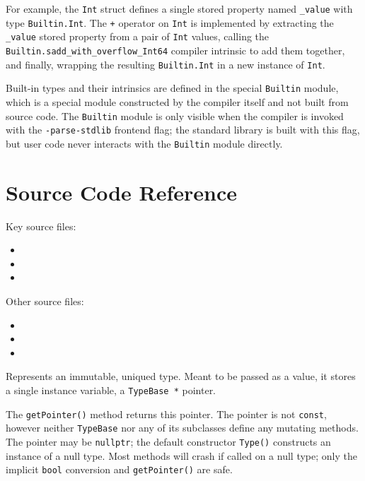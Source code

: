 \documentclass[../generics]{subfiles}
\begin{document}
For example, the \texttt{Int} struct defines a single stored property named \texttt{\_value} with type \texttt{Builtin.Int}. The \texttt{+} operator on \texttt{Int} is implemented by extracting the \texttt{\_value} stored property from a pair of \texttt{Int} values, calling the \texttt{Builtin.sadd\_with\_overflow\_Int64} compiler intrinsic to add them together, and finally, wrapping the resulting \texttt{Builtin.Int} in a new instance of \texttt{Int}.

Built-in types and their intrinsics are defined in the special \texttt{Builtin} module, which is a special module constructed by the compiler itself and not built from source code. The \texttt{Builtin} module is only visible when the compiler is invoked with the \texttt{-parse-stdlib} frontend flag; the standard library is built with this flag, but user code never interacts with the \texttt{Builtin} module directly.

\section{Source Code Reference}\label{typesourceref}

Key source files:
\begin{itemize}
\item {}
\item {}
\item {}
\end{itemize}
Other source files:
\begin{itemize}
\item {}
\item {}
\item {}
\end{itemize}

Represents an immutable, uniqued type. Meant to be passed as a value, it stores a single instance variable, a \texttt{TypeBase *} pointer.

The \texttt{getPointer()} method returns this pointer. The pointer is not \texttt{const}, however neither \texttt{TypeBase} nor any of its subclasses define any mutating methods. The pointer may be \texttt{nullptr}; the default constructor \texttt{Type()} constructs an instance of a null type. Most methods will crash if called on a null type; only the implicit \texttt{bool} conversion and \texttt{getPointer()} are safe.
\end{document}
